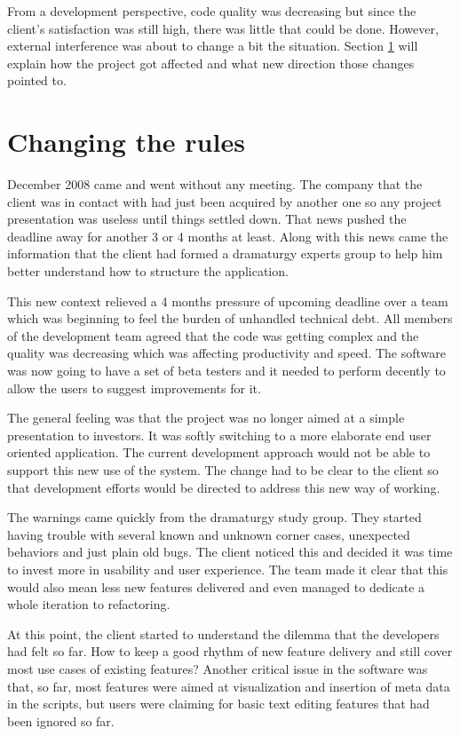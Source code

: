\documentclass[lnbip]{svmultln}
\begin{document}
From a development perspective, code quality was decreasing but since
the client's satisfaction was still high, there was little that could
be done.  However, external interference was about to change a bit the
situation. Section \ref{sec:changes} will explain how the project got
affected and what new direction those changes pointed to.

\section{Changing the rules}
\label{sec:changes}

December 2008 came and went without any meeting. The company that the
client was in contact with had just been acquired by another one so
any project presentation was useless until things settled down. That
news pushed the deadline away for another 3 or 4 months at
least. Along with this news came the information that the client had
formed a dramaturgy experts group to help him better understand how to
structure the application.

This new context relieved a 4 months pressure of upcoming deadline
over a team which was beginning to feel the burden of unhandled
technical debt. All members of the development team agreed that the
code was getting complex and the quality was decreasing which was
affecting productivity and speed. The software was now going to have a
set of beta testers and it needed to perform decently to allow the
users to suggest improvements for it.

The general feeling was that the project was no longer aimed at a
simple presentation to investors. It was softly switching to a more
elaborate end user oriented application. The current development
approach would not be able to support this new use of the system. The
change had to be clear to the client so that development efforts would
be directed to address this new way of working.

The warnings came quickly from the dramaturgy study group. They
started having trouble with several known and unknown corner cases,
unexpected behaviors and just plain old bugs. The client noticed this
and decided it was time to invest more in usability and user
experience. The team made it clear that this would also mean less new
features delivered and even managed to dedicate a whole iteration to
refactoring.

At this point, the client started to understand the dilemma that the
developers had felt so far. How to keep a good rhythm of new feature
delivery and still cover most use cases of existing features? Another
critical issue in the software was that, so far, most features were
aimed at visualization and insertion of meta data in the scripts, but
users were claiming for basic text editing features that had been
ignored so far.
\end{document}
